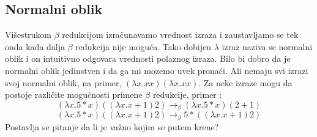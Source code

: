 \documentclass[../main.tex]{subfiles}
\begin{document}
\subsection{Normalni oblik}		%

Višestrukom $\beta$ redukcijom izračunavamo vrednost izraza i zaustavljamo se tek onda kada dalja $\beta$ redukcija nije moguća. Tako dobijen $\lambda$ izraz naziva se normalni oblik i on intuitivno odgovara vrednosti polaznog izraza. Bilo bi dobro da je normalni oblik jedinstven i da ga mi mozemo uvek pronaći. Ali nemaju svi izrazi svoj normalni oblik, na primer, $(\lambda x.x x)(\lambda x.x x)$. Za neke izraze mogu da postoje različite mogućnosti primene $\beta$ redukcije, primer :
$$(\lambda x.5 * x)((\lambda x.x + 1)2) \rightarrow_\beta (\lambda x.5 * x)(2+1)$$
$$(\lambda x.5 * x)((\lambda x.x + 1)2) \rightarrow_\beta 5 * ((\lambda x.x + 1)2)$$
Postavlja se pitanje da li je važno kojim se putem krene?
\end{document}
